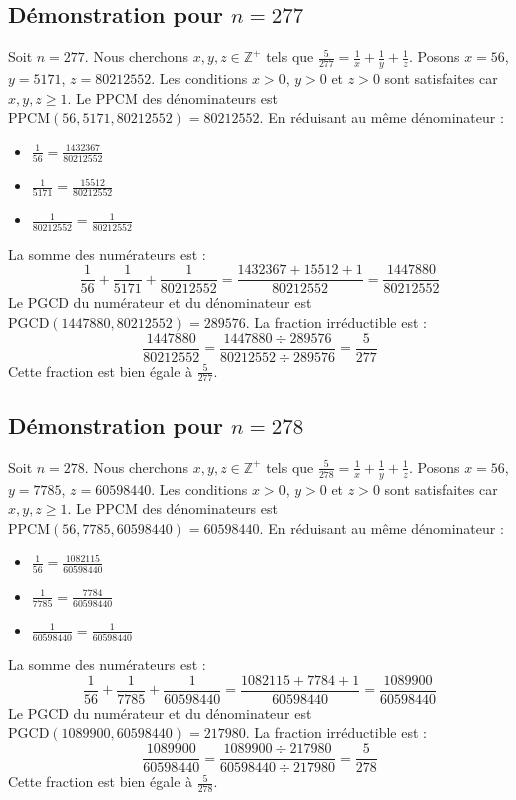 \documentclass[11pt,a4paper]{article}
\begin{document}
\subsection{Démonstration pour $n = 277$}
Soit $n = 277$. Nous cherchons $x, y, z \in \mathbb{Z}^{+}$ tels que $\frac{5}{277} = \frac{1}{x} + \frac{1}{y} + \frac{1}{z}$.
Posons $x = 56$, $y = 5171$, $z = 80212552$.
Les conditions $x > 0$, $y > 0$ et $z > 0$ sont satisfaites car $x, y, z \geq 1$.
Le PPCM des dénominateurs est $\text{PPCM}(56, 5171, 80212552) = 80212552$.
En réduisant au même dénominateur :
\begin{itemize}
    \item $\frac{1}{56} = \frac{1432367}{80212552}$
    \item $\frac{1}{5171} = \frac{15512}{80212552}$
    \item $\frac{1}{80212552} = \frac{1}{80212552}$
\end{itemize}
La somme des numérateurs est :
$$ \frac{1}{56} + \frac{1}{5171} + \frac{1}{80212552} = \frac{1432367 + 15512 + 1}{80212552} = \frac{1447880}{80212552} $$
Le PGCD du numérateur et du dénominateur est $\text{PGCD}(1447880, 80212552) = 289576$.
La fraction irréductible est :
$$ \frac{1447880}{80212552} = \frac{1447880 \div 289576}{80212552 \div 289576} = \frac{5}{277} $$
Cette fraction est bien égale à $\frac{5}{277}$.

\subsection{Démonstration pour $n = 278$}
Soit $n = 278$. Nous cherchons $x, y, z \in \mathbb{Z}^{+}$ tels que $\frac{5}{278} = \frac{1}{x} + \frac{1}{y} + \frac{1}{z}$.
Posons $x = 56$, $y = 7785$, $z = 60598440$.
Les conditions $x > 0$, $y > 0$ et $z > 0$ sont satisfaites car $x, y, z \geq 1$.
Le PPCM des dénominateurs est $\text{PPCM}(56, 7785, 60598440) = 60598440$.
En réduisant au même dénominateur :
\begin{itemize}
    \item $\frac{1}{56} = \frac{1082115}{60598440}$
    \item $\frac{1}{7785} = \frac{7784}{60598440}$
    \item $\frac{1}{60598440} = \frac{1}{60598440}$
\end{itemize}
La somme des numérateurs est :
$$ \frac{1}{56} + \frac{1}{7785} + \frac{1}{60598440} = \frac{1082115 + 7784 + 1}{60598440} = \frac{1089900}{60598440} $$
Le PGCD du numérateur et du dénominateur est $\text{PGCD}(1089900, 60598440) = 217980$.
La fraction irréductible est :
$$ \frac{1089900}{60598440} = \frac{1089900 \div 217980}{60598440 \div 217980} = \frac{5}{278} $$
Cette fraction est bien égale à $\frac{5}{278}$.
\end{document}

